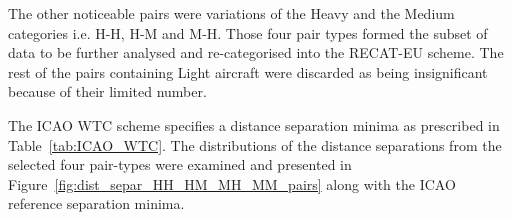 \begin{table}[h]
\centering
{}
\caption[BIKF traffic mix sorted into ICAO WTC]{Number of ICAO pairs from the traffic mix at BIKF during peak hours, arranged into the corresponding wake category. The majority of aircraft pairs comprise the M-M category (69,9\%), followed by M-H (14,3\%), H-M (12,9\%) and H-H (2,1\%) pairs. The observation period is from October 2017 to November 2018.}
\label{tab:pairs_mix_to_wtc}
\end{table}

The other noticeable pairs were variations of the Heavy and the Medium categories i.e. H-H, H-M and M-H. Those four pair types formed the subset of data to be further analysed and re-categorised into the RECAT-EU scheme. The rest of the pairs containing Light aircraft were discarded as being insignificant because of their limited number. 

The ICAO WTC scheme specifies a distance separation minima as prescribed in  Table~\ref{tab:ICAO_WTC}. The distributions of the distance separations from the selected four pair-types were examined and presented in Figure~\ref{fig:dist_separ_HH_HM_MH_MM_pairs} along with the ICAO reference separation minima. 

